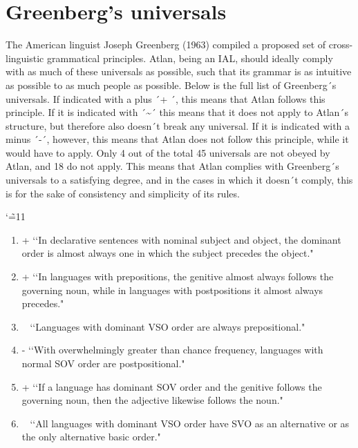 \section{Greenberg's universals}

The American linguist Joseph Greenberg (1963) compiled a proposed set of cross-linguistic grammatical principles. Atlan, being an IAL, should ideally comply with as much of these universals as possible, such that its grammar is as intuitive as possible to as much people as possible. Below is the full list of Greenberg´s universals. If indicated with a plus ´+ ´, this means that Atlan follows this principle. If it is indicated with ´\~{}´ this means that it does not apply to Atlan´s structure, but therefore also doesn´t break any universal. If it is indicated with a minus ´-´, however, this means that Atlan does not follow this principle, while it would have to apply. Only 4 out of the total 45 universals are not obeyed by Atlan, and 18 do not apply. This means that Atlan complies with Greenberg´s universals to a satisfying degree, and in the cases in which it doesn´t comply, this is for the sake of consistency and simplicity of its rules. 

\begingroup
\catcode`\~=11
\begin{enumerate}
\item +  \lq\lq In declarative sentences with nominal subject and object, the dominant order is almost always one in which the subject precedes the object." 

\item +  \lq\lq In languages with prepositions, the genitive almost always follows the governing noun, while in languages with postpositions it almost always precedes." 

\item ~  \lq\lq Languages with dominant VSO order are always prepositional." 

\item -  \lq\lq With overwhelmingly greater than chance frequency, languages with normal SOV order are postpositional." 

\item +  \lq\lq If a language has dominant SOV order and the genitive follows the governing noun, then the adjective likewise follows the noun." 

\item ~  \lq\lq All languages with dominant VSO order have SVO as an alternative or as the only alternative basic order." 
\end{enumerate}

